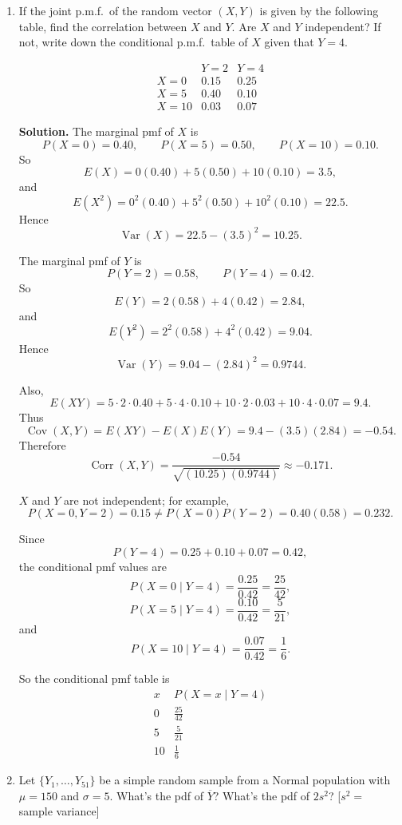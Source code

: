 \documentclass[12pt]{article}
\begin{document}
\begin{enumerate}[label=(\arabic*), leftmargin=*]
\item If the joint p.m.f.\ of the random vector $(X,Y)$ is given by the following table, find the correlation between $X$ and $Y$. Are $X$ and $Y$ independent? If not, write down the conditional p.m.f.\ table of $X$ given that $Y=4$.

\[
\begin{array}{c|cc}
 & Y=2 & Y=4 \\\hline
X=0 & 0.15 & 0.25 \\
X=5 & 0.40 & 0.10 \\
X=10 & 0.03 & 0.07
\end{array}
\]

\par\medskip
\noindent\textbf{Solution.}
The marginal pmf of $X$ is
\[
P(X=0)=0.40,\qquad P(X=5)=0.50,\qquad P(X=10)=0.10.
\]
So
\[
E(X)=0(0.40)+5(0.50)+10(0.10)=3.5,
\]
and
\[
E(X^2)=0^2(0.40)+5^2(0.50)+10^2(0.10)=22.5.
\]
Hence
\[
\operatorname{Var}(X)=22.5-(3.5)^2=10.25.
\]

The marginal pmf of $Y$ is
\[
P(Y=2)=0.58,\qquad P(Y=4)=0.42.
\]
So
\[
E(Y)=2(0.58)+4(0.42)=2.84,
\]
and
\[
E(Y^2)=2^2(0.58)+4^2(0.42)=9.04.
\]
Hence
\[
\operatorname{Var}(Y)=9.04-(2.84)^2=0.9744.
\]

Also,
\[
E(XY)=5\cdot 2\cdot 0.40+5\cdot 4\cdot 0.10+10\cdot 2\cdot 0.03+10\cdot 4\cdot 0.07=9.4.
\]
Thus
\[
\operatorname{Cov}(X,Y)=E(XY)-E(X)E(Y)=9.4-(3.5)(2.84)=-0.54.
\]
Therefore
\[
\operatorname{Corr}(X,Y)=\frac{-0.54}{\sqrt{(10.25)(0.9744)}}\approx -0.171.
\]

$X$ and $Y$ are not independent; for example,
\[
P(X=0,Y=2)=0.15 \neq P(X=0)P(Y=2)=0.40(0.58)=0.232.
\]

Since
\[
P(Y=4)=0.25+0.10+0.07=0.42,
\]
the conditional pmf values are
\[
P(X=0\mid Y=4)=\frac{0.25}{0.42}=\frac{25}{42},
\]
\[
P(X=5\mid Y=4)=\frac{0.10}{0.42}=\frac{5}{21},
\]
and
\[
P(X=10\mid Y=4)=\frac{0.07}{0.42}=\frac16.
\]

So the conditional pmf table is
\[
\begin{array}{c|c}
x & P(X=x\mid Y=4) \\\hline
0 & \frac{25}{42} \\
5 & \frac{5}{21} \\
10 & \frac16
\end{array}
\]

\item Let $\{Y_1,\ldots,Y_{51}\}$ be a simple random sample from a Normal population with $\mu=150$ and $\sigma=5$. What's the pdf of $\overline{Y}$? What's the pdf of $2s^2$? [$s^2=$ sample variance]


\end{enumerate}
\end{document}
